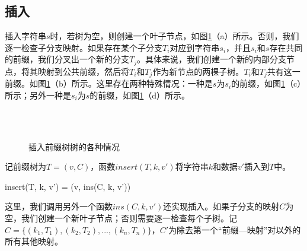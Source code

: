 \documentclass[b5paper]{ctexart}
\begin{document}
\subsection{插入}

插入字符串$s$时，若树为空，则创建一个叶子节点，如图\ref{fig:patricia-insert}（a）所示。否则，我们逐一检查子分支映射。如果存在某个子分支$T_i$对应到字符串$s_i$，并且$s_i$和$s$存在共同的前缀，我们分叉出一个新的分支$T_j$。具体来说，我们创建一个新的内部分支节点，将其映射到公共前缀，然后将$T_i$和$T_j$作为新节点的两棵子树。$T_i$和$T_j$共有这一前缀。如图\ref{fig:patricia-insert}（b）所示。这里存在两种特殊情况：一种是$s$为$s_i$的前缀，如图\ref{fig:patricia-insert}（c）所示；另外一种是$s_i$为$s$的前缀，如图\ref{fig:patricia-insert}（d）所示。

\begin{figure}[htbp]
  \centering
  \hspace{.1\textwidth}
   \\
   \\
  \caption{插入前缀树树的各种情况}
  \label{fig:patricia-insert}
\end{figure}

记前缀树为$T = (v, C)$，函数$insert(T, k, v')$将字符串$k$和数据$v'$插入到$T$中。

\be
insert(T, k, v') = (v, ins(C, k, v'))
\ee

这里，我们调用另外一个函数$ins(C, k, v')$还实现插入。如果子分支的映射$C$为空，我们创建一个新叶子节点；否则需要逐一检查每个子树。记$C = \{(k_1, T_1), (k_2, T_2), ..., (k_n, T_n)\}$，$C'$为除去第一个“前缀—映射”对以外的所有其他映射。
\end{document}
